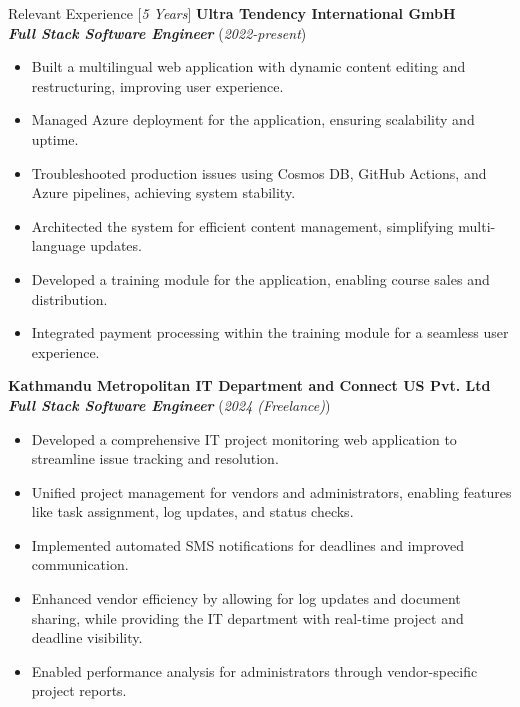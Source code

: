 \documentclass{resume} %
\begin{document}
\begin{rSection}{Relevant Experience [\textit{5 Years}]}
    \large{{\bf Ultra Tendency International GmbH}}
    \\ \small{\textit{\textbf{Full Stack Software Engineer}}} (\small{\textit{2022-present}})

    \begin{itemize}
        \item Built a multilingual web application with dynamic content editing and restructuring, improving user experience.
        \item Managed Azure deployment for the application, ensuring scalability and uptime.
        \item Troubleshooted production issues using Cosmos DB, GitHub Actions, and Azure pipelines, achieving system stability.
        \item Architected the system for efficient content management, simplifying multi-language updates.
        \item Developed a training module for the application, enabling course sales and distribution.
        \item Integrated payment processing within the training module for a seamless user experience.
    \end{itemize}

    \large{{\bf Kathmandu Metropolitan IT Department and Connect US Pvt. Ltd}}
    \\ \small{\textit{\textbf{Full Stack Software Engineer}}} (\small{\textit{2024 (Freelance)}})

    \begin{itemize}
        \item Developed a comprehensive IT project monitoring web application to streamline issue tracking and resolution.
        \item Unified project management for vendors and administrators, enabling features like task assignment, log updates, and status checks.
        \item Implemented automated SMS notifications for deadlines and improved communication.
        \item Enhanced vendor efficiency by allowing for log updates and document sharing, while providing the IT department with real-time project and deadline visibility.
        \item Enabled performance analysis for administrators through vendor-specific project reports.


\end{itemize}
\end{rSection}
\end{document}
